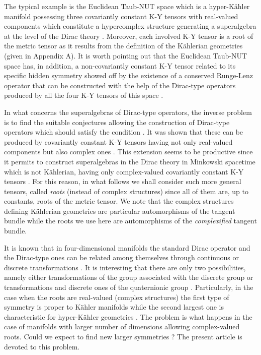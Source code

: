 \documentclass[a4paper,12pt]{article}
\begin{document}
The typical example is the Euclidean Taub-NUT space which is a 
hyper-K\" ahler manifold 
possessing three covariantly constant K-Y tensors with real-valued components 
which constitute a hypercomplex structure generating a \coordHE{} superalgebra at 
the level of the Dirac theory \cite{CV0}. Moreover, each involved K-Y tensor 
is a root of the metric tensor as it results from the definition of the 
K\" ahlerian geometries (given in Appendix A). It is worth 
pointing out that the Euclidean Taub-NUT space has, in addition, a 
non-covariantly 
constant K-Y tensor related to its specific hidden symmetry showed off 
by the existence of a conserved Runge-Lenz operator that can be constructed 
with the help of the Dirac-type operators produced by all the four K-Y tensors 
of this space \cite{CV}.   

In what concerns the superalgebras of Dirac-type operators, the inverse 
problem is to find the suitable conjectures allowing the construction of 
Dirac-type operators \coordHE{} which should satisfy the condition 
\coordHE{}. It 
was shown that these can be produced by covariantly constant K-Y tensors 
having not only real-valued components but also complex ones \cite{K1,K2}. 
This extension seems to be productive since it permits to construct 
superalgebras in the Dirac theory in Minkowski spacetime which is not 
K\" ahlerian, having only complex-valued covariantly constant K-Y tensors 
\cite{K2}. For this reason, in what follows we shall consider such more 
general tensors, called  {\em roots} (instead of complex structures) since all 
of them are, up to constants, roots of the metric tensor. We note that
the complex structures defining K\" ahlerian geometries are 
particular automorphisms of the tangent bundle while the roots we use  
here are automorphisms of the {\em complexified} tangent bundle.   

It is known that in four-dimensional manifolds the standard Dirac operator 
and the Dirac-type ones can be related among themselves through continuous 
or discrete transformations \cite{CV1,K2}. It is interesting that there 
are only two possibilities, namely either transformations of the \coordHE{} group 
associated with the discrete group \coordHE{} or \coordHE{} transformations 
and discrete ones of the quaternionic group \coordHE{} \cite{CV1,K2}. 
Particularly, in the case when the roots are real-valued (complex structures) 
the first type of symmetry is proper to  K\" ahler manifolds while the second 
largest one is characteristic for hyper-K\" ahler geometries \cite{CV1}. The 
problem is what happens in the case of manifolds with larger number of 
dimensions allowing complex-valued roots. Could we expect to find new larger 
symmetries ? The present article is devoted to this problem.      
\end{document}
